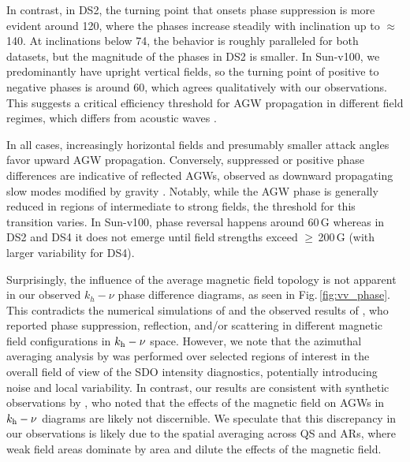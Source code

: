 \documentclass[preprint2,linenumbers]{aastex701}
\begin{document}
In contrast, in DS2, the turning point that onsets phase suppression is more evident around 120\textdegree, where the phases increase steadily with inclination up to $\approx$\,140\textdegree.
At inclinations below 74\textdegree, the behavior is roughly paralleled for both datasets, but the magnitude of the phases in DS2 is smaller.
In Sun-v100, we predominantly have upright vertical fields, so the turning point of positive to negative phases is around 60\textdegree, which agrees qualitatively with our observations.
This suggests a critical efficiency threshold for AGW propagation in different field regimes, which differs from acoustic waves \citep{2006_Schunker_Cally, 2012_Khomenko_Cally}.

In all cases, increasingly horizontal fields and presumably smaller attack angles favor upward AGW propagation.
Conversely, suppressed or positive phase differences are indicative of reflected AGWs, observed as downward propagating slow modes modified by gravity \citep{2009_Newington_Cally, 2016_Hague_Erdelyi}.
Notably, while the AGW phase is generally reduced in regions of intermediate to strong fields, the threshold for this transition varies.
In Sun-v100, phase reversal happens around 60\,G whereas in DS2 and DS4 it does not emerge until field strengths exceed $\geq$\,200\,G (with larger variability for DS4).

Surprisingly, the influence of the average magnetic field topology is not apparent in our observed $k_h-\nu$ phase difference diagrams, as seen in Fig.\,\ref{fig:vv_phase}.
This contradicts the numerical simulations of \citet{2017_Vigeesh, 2021_Vigeesh_Roth_Steiner_Fleck} and the observed results of \citet{2023_Kumar_Jumar_Rajaguru_Mathew_Bayanna}, who reported phase suppression, reflection, and/or scattering in different magnetic field configurations in $k_{\rm{h}}-\nu$ space.
However, we note that the azimuthal averaging analysis by \citeauthor{2023_Kumar_Jumar_Rajaguru_Mathew_Bayanna} was performed over selected regions of interest in the overall field of view of the SDO intensity diagnostics, potentially introducing noise and local variability.
In contrast, our results are consistent with synthetic observations by \citet{2020_Vigeesh_Roth}, who noted that the effects of the magnetic field on AGWs in $k_{\rm{h}}-\nu$ diagrams are likely not discernible.
We speculate that this discrepancy in our observations is likely due to the spatial averaging across QS and ARs, where weak field areas dominate by area and dilute the effects of the magnetic field.
\end{document}
